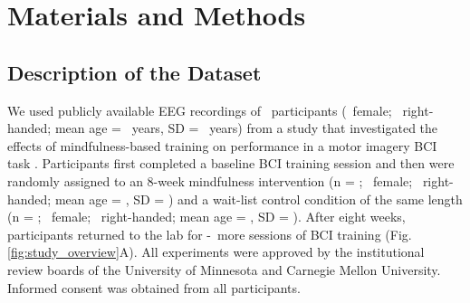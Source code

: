 \section{Materials and Methods}
    
\subsection{Description of the Dataset}

We used publicly available EEG recordings of \numSubjects~participants (\numFemaleSubjects~female; \numRightHandedSubjects~right-handed; mean age = \meanAge~years, SD = \sdAge~years) from a study that investigated the effects of mindfulness-based training on performance in a motor imagery BCI task \citep{Stieger2021_dataset}. Participants first completed a baseline BCI training session and then were randomly assigned to an 8-week mindfulness intervention (n = \numMBSRSubjects; \numFemaleMBSRSubjects~female; \numRightHandedMBSRSubjects~right-handed; mean age = \meanAgeMBSR, SD = \sdAgeMBSR) and a wait-list control condition of the same length (n = \numControlSubjects; \numFemaleControlSubjects~female; \numRightHandedControlSubjects~right-handed; mean age = \meanAgeControl, SD = \sdAgeControl). After eight weeks, participants returned to the lab for \numFollowUpSessionsMin-\numFollowUpSessionsMax~more sessions of BCI training (Fig. \ref{fig:study_overview}A). All experiments were approved by the institutional review boards of the University of Minnesota and Carnegie Mellon University. Informed consent was obtained from all participants.

